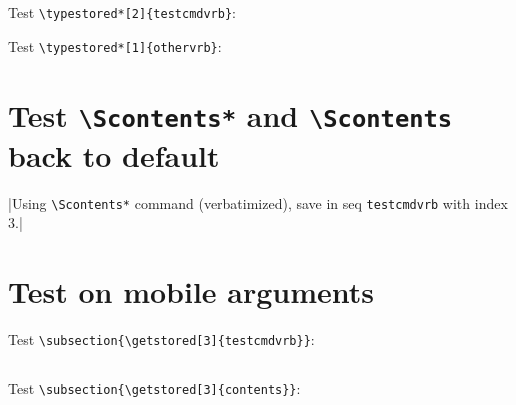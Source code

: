 \documentclass{article}
\begin{document}

\noindent\hrulefill

Test \verb+\typestored*[2]{testcmdvrb}+:\par


\noindent\hrulefill

Test \verb+\typestored*[1]{othervrb}+:\par


\noindent\hrulefill

\section{Test \texttt{\textbackslash Scontents*} and \texttt{\textbackslash Scontents} back to default}


\Scontents*|Using \texttt{\textbackslash Scontents*} command (verbatimized), save in seq \texttt{testcmdvrb} with index $3$.|

\section{Test on mobile arguments}

\noindent\hrulefill

Test \verb+\subsection{\getstored[3]{testcmdvrb}}+:\par

\subsection{}

\noindent\hrulefill

Test \verb+\subsection{\getstored[3]{contents}}+:\par

\subsection{}
\end{document}
